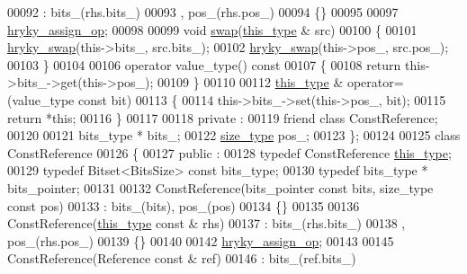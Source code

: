 \begin{DoxyCode}
00092             : bits\_(rhs.bits\_)
00093               , pos\_(rhs.pos\_)
00094         \{\}
00095 
00097         \hyperlink{classhryky_1_1_bitset_add97c3079f3c0f0ee7b39c40a4c8d498}{hryky_assign_op};
00098 
00099         \textcolor{keywordtype}{void} \hyperlink{classhryky_1_1_bitset_a85e9dae700136067e615b385ea8f4e14}{swap}(\hyperlink{classhryky_1_1_bitset_a967bec88789e12e2ca96e7a73907822c}{this_type} & src)
00100         \{
00101             \hyperlink{namespacehryky_add9c1c1fdfda07cd47bcb7c16d3a823a}{hryky_swap}(this->bits\_, src.bits\_);
00102             \hyperlink{namespacehryky_add9c1c1fdfda07cd47bcb7c16d3a823a}{hryky_swap}(this->pos\_, src.pos\_);
00103         \}
00104 
00106         operator value\_type()\textcolor{keyword}{ const}
00107 \textcolor{keyword}{        }\{
00108             \textcolor{keywordflow}{return} this->bits\_->get(this->pos\_);
00109         \}
00110 
00112         \hyperlink{classhryky_1_1_bitset_a967bec88789e12e2ca96e7a73907822c}{this_type} & operator=(value\_type \textcolor{keyword}{const} bit)
00113         \{
00114             this->bits\_->set(this->pos\_, bit);
00115             \textcolor{keywordflow}{return} *\textcolor{keyword}{this};
00116         \}
00117 
00118     \textcolor{keyword}{private} :
00119         \textcolor{keyword}{friend} \textcolor{keyword}{class }ConstReference;
00120         
00121         bits\_type * bits\_;
00122         \hyperlink{namespacehryky_1_1display_a88ee3bfa154cce4c6715af0c3f53d062}{size_type} pos\_;
00123     \};
00124 
00125     \textcolor{keyword}{class }ConstReference
00126     \{
00127     \textcolor{keyword}{public} :
00128         \textcolor{keyword}{typedef} ConstReference \hyperlink{classhryky_1_1_bitset_a967bec88789e12e2ca96e7a73907822c}{this_type};
00129         \textcolor{keyword}{typedef} Bitset<BitsSize> \textcolor{keyword}{const} bits\_type;
00130         \textcolor{keyword}{typedef} bits\_type * bits\_pointer;
00131         
00132         ConstReference(bits\_pointer \textcolor{keyword}{const} bits, size\_type \textcolor{keyword}{const} pos)
00133             : bits\_(bits), pos\_(pos)
00134         \{\}
00135 
00136         ConstReference(\hyperlink{classhryky_1_1_bitset_a967bec88789e12e2ca96e7a73907822c}{this_type} \textcolor{keyword}{const} & rhs)
00137             : bits\_(rhs.bits\_)
00138               , pos\_(rhs.pos\_)
00139         \{\}
00140 
00142         \hyperlink{classhryky_1_1_bitset_add97c3079f3c0f0ee7b39c40a4c8d498}{hryky_assign_op};
00143 
00145         ConstReference(Reference \textcolor{keyword}{const} & ref)
00146             : bits\_(ref.bits\_)

\end{DoxyCode}
